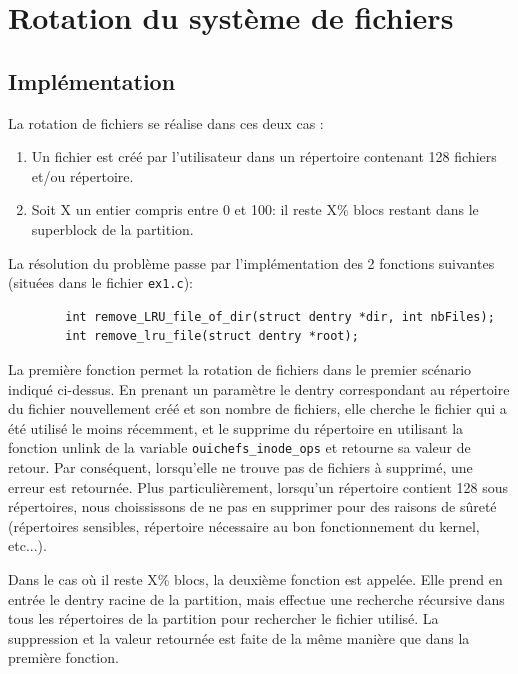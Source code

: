 \documentclass{article}
\begin{document}
	\section{Rotation du système de fichiers}
	\subsection{Implémentation}

    La rotation de fichiers se réalise dans ces deux cas :
	\begin{enumerate}
        \item Un fichier est créé par l'utilisateur dans un répertoire contenant 128 fichiers et/ou répertoire.
        \item Soit X un entier compris entre 0 et 100: il reste X\% blocs restant dans le superblock de la partition.
        \newline
    \end{enumerate}
    La résolution du problème passe par l'implémentation des 2 fonctions suivantes (situées dans le fichier \verb|ex1.c|):
	\begin{lstlisting}
		int remove_LRU_file_of_dir(struct dentry *dir, int nbFiles);
		int remove_lru_file(struct dentry *root);
	\end{lstlisting}
	
	La première fonction permet la rotation de fichiers dans le premier scénario indiqué ci-dessus. En prenant un paramètre le dentry correspondant au répertoire du fichier nouvellement créé et son nombre de fichiers, elle cherche le fichier qui a été utilisé le moins récemment, et le supprime du répertoire en utilisant la fonction unlink de la variable \verb|ouichefs_inode_ops| et retourne sa valeur de retour. Par conséquent, lorsqu'elle ne trouve pas de fichiers à supprimé, une erreur est retournée. Plus particulièrement, lorsqu'un répertoire contient 128 sous répertoires, nous choississons de ne pas en supprimer pour des raisons de sûreté (répertoires sensibles, répertoire nécessaire au bon fonctionnement du kernel, etc...).\newline
	
	
	Dans le cas où il reste X\% blocs, la deuxième fonction est appelée. Elle prend en entrée le dentry racine de la partition, mais effectue une recherche récursive dans tous les répertoires de la partition pour rechercher le fichier utilisé. La suppression et la valeur retournée est faite de la même manière que dans la première fonction.\newline
	
\end{document}
